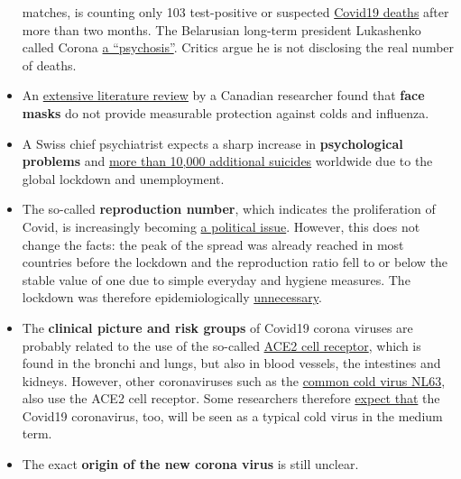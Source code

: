 \begin{itemize}
  matches, is counting only 103 test-positive or suspected
  \href{https://en.wikipedia.org/wiki/COVID-19_pandemic_in_Belarus}{Covid19
  deaths} after more than two months. The Belarusian long-term president
  Lukashenko called Corona
  \href{https://www.baltictimes.com/lukashenko__coronavirus_is_psychosis/}{a
  ``psychosis''}. Critics argue he is not disclosing the real number of
  deaths.
\item
  An
  \href{https://covidinfos.net/wp-content/uploads/2020/05/MasksDon-twork-4.pdf}{extensive
  literature review} by a Canadian researcher found that \textbf{face
  masks} do not provide measurable protection against colds and
  influenza.
\item
  A Swiss chief psychiatrist expects a sharp increase in
  \textbf{psychological problems} and
  \href{https://www.aargauerzeitung.ch/aargau/kanton-aargau/aargauer-psychiatrie-chefarzt-kawohl-warnt-arbeitslosigkeit-erhoeht-das-suizidrisiko-137742663}{more
  than 10,000 additional suicides} worldwide due to the global lockdown
  and unemployment.
\item
  The so-called \textbf{reproduction number}, which indicates the
  proliferation of Covid, is increasingly becoming
  \href{https://www.tagesschau.de/faktenfinder/corona-reproduktionszahl-101.html}{a
  political issue}. However, this does not change the facts: the peak of
  the spread was already reached in most countries before the lockdown
  and the reproduction ratio fell to or below the stable value of one
  due to simple everyday and hygiene measures. The lockdown was
  therefore epidemiologically
  \href{https://infekt.ch/2020/04/sind-wir-tatsaechlich-im-blindflug/}{unnecessary}.
\item
  The \textbf{clinical picture and risk groups} of Covid19 corona
  viruses are probably related to the use of the so-called
  \href{https://www.news-medical.net/news/20200420/ACE2-TMPRSS2-profiling-indicates-tissue-vulnerability-to-SARS-CoV-2-infection.aspx}{ACE2
  cell receptor}, which is found in the bronchi and lungs, but also in
  blood vessels, the intestines and kidneys. However, other
  coronaviruses such as the
  \href{https://www.ncbi.nlm.nih.gov/pmc/articles/PMC4369385/}{common
  cold virus NL63}, also use the ACE2 cell receptor. Some researchers
  therefore
  \href{https://www.ncbi.nlm.nih.gov/pmc/articles/PMC7074995/}{expect
  that} the Covid19 coronavirus, too, will be seen as a typical cold
  virus in the medium term.
\item
  The exact \textbf{origin of the new corona virus} is still unclear.

\end{itemize}
